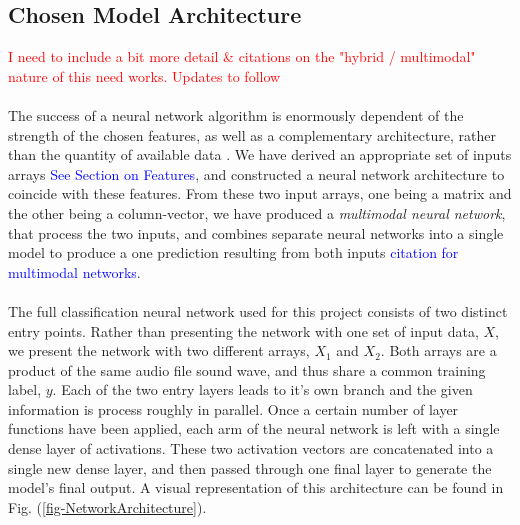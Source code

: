 \documentclass[12pt,letterpaper]{article}
\begin{document}
\subsection{Chosen Model Architecture}
\label{sec-Architecture}

\textcolor{red}{I need to include a bit more detail \& citations on the "hybrid / multimodal" nature of this need works. Updates to follow}

\paragraph*{}The success of a neural network algorithm is enormously dependent of the strength of the chosen features, as well as a complementary architecture, rather than the quantity of available data \cite{Geron,Kahn,Liu}. We have derived an appropriate set of inputs arrays \textcolor{blue}{See Section on Features}, and constructed a neural network architecture to coincide with these features. From these two input arrays, one being a matrix and the other being a column-vector, we have produced a \textit{multimodal neural network}, that process the two inputs, and combines separate neural networks into a single model to produce a one prediction resulting from both inputs \textcolor{blue}{citation for multimodal networks}.

\paragraph*{}The full classification neural network used for this project consists of two distinct entry points. Rather than presenting the network with one set of input data, $X$, we present the network with two different arrays, $X_1$ and $X_2$. Both arrays are a product of the same audio file sound wave, and thus share a common training label, $y$. Each of the two entry layers leads to it's own branch and the given information is process roughly in parallel. Once a certain number of layer functions have been applied, each arm of the neural network is left with a single dense layer of activations. These two activation vectors are concatenated into a single new dense layer, and then passed through one final layer to generate the model's final output. A visual representation of this architecture can be found in Fig. (\ref{fig-NetworkArchitecture}).
\end{document}
